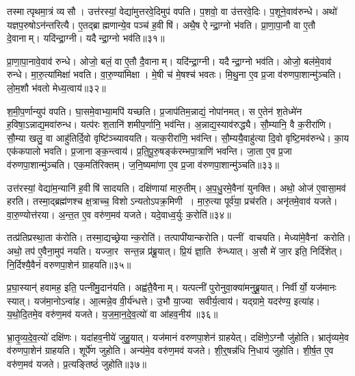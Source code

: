 तस्मात्पृथमा॒त्रं व्यसौ।
उत्त॑रस्यां॒ वेद्या॑मुत्तरवे॒दिमुप॑ वपति।
प॒शवो॒ वा उ॑त्तरवे॒दिः।
प॒शूने॒वाव॑रुन्धे।
अथो॑ यज्ञप॒रुषोऽन॑न्तरित्यै।
ए॒तद्ब्राह्मणान्ये॒व पञ्च॑ ह॒वीषि॑।
अथै॒ष ऐन्द्रा॒ग्नो भ॑वति।
प्रा॒णा॒पा॒नौ वा ए॒तौ दे॒वानाम्।
यदि॑न्द्रा॒ग्नी।
यदैन्द्रा॒ग्नो भव॑ति॥३१॥

प्रा॒णा॒पा॒नावे॒वाव॑ रुन्धे।
ओजो॒ बलं॒ वा ए॒तौ दै॒वानाम्।
यदि॑न्द्रा॒ग्नी।
यदैन्द्रा॒ग्नो भव॑ति।
ओजो॒ बल॑मे॒वाव॑ रुन्धे।
मा॒रु॒त्या॑मिक्षा॑ भवति।
वा॒रु॒ण्या॑मिक्षा।
मे॒षी च॑ मे॒षश्च॑ भवतः।
मि॒थु॒ना ए॒व प्र॒जा व॑रुणपा॒शान्मु॑ञ्चति।
लो॒म॒शौ भ॑वतो मेध्य॒त्वाय॑॥३२॥

श॒मी॒प॒र्णान्युप॑ वपति।
घा॒समे॒वाभ्या॒मपि॑ यच्छति।
प्र॒जाप॑तिम॒न्नाद्यं॒ नोपा॑नमत्।
स ए॒तेन॑ श॒तेध्मे॑न ह॒विषा॒ऽन्नाद्य॒मवा॑रुन्ध।
यत्प॑रः श॒तानि॑ शमीप॒र्णानि॒ भव॑न्ति।
अ॒न्नाद्य॒स्याव॑रुद्ध्यै।
सौ॒म्यानि॒ वै क॒रीरा॑णि।
सौ॒म्या खलु॒ वा आहु॑तिर्दि॒वो वृष्टि॑ञ्च्यावयति।
यत्क॒रीरा॑णि॒ भव॑न्ति।
सौ॒म्ययै॒वाहु॑त्या दि॒वो वृष्टि॒मव॑रुन्धे।
का॒य एक॑कपालो भवति।
प्र॒जानाङ्क॒न्त्वाय॑।
प्र॒ति॒पू॒रु॒षङ्क॑रम्भपा॒त्राणि॑ भवन्ति।
जा॒ता ए॒व प्र॒जा व॑रुणपा॒शान्मु॑ञ्चति।
एक॒मति॑रिक्तम्।
ज॒नि॒ष्यमा॑णा ए॒व प्र॒जा व॑रुणपा॒शान्मु॑ञ्चति॥३३॥\anuvakamend[नि॒रु॒प्यन्ते॑ भवतो॒ भव॑ति मेध्य॒त्वाय॑ रुन्धे॒ षट्च॑]

उत्त॑रस्यां॒ वेद्या॑म॒न्यानि॑ ह॒वीषि॑ सादयति।
दक्षि॑णायां मारु॒तीम्।
अ॒प॒धु॒रमे॒वैना॑ युनक्ति।
अथो॒ ओज॑ ए॒वासा॒मव॑ हरति।
तस्मा॒द्ब्रह्म॑णश्च क्ष॒त्राच्च॒ विशोऽन्यतोऽपक्र॒मिणी।
मा॒रु॒त्या पूर्व॑या॒ प्रच॑रति।
अनृ॑तमे॒वाव॑ यजते।
वा॒रु॒ण्योत्त॑रया।
अ॒न्त॒त ए॒व वरु॑ण॒मव॑ यजते।
यदे॒वाध्व॒र्युः क॒रोति॑॥३४॥

तत्प्र॑तिप्रस्था॒ता क॑रोति।
तस्मा॒द्यच्छ्रेयान्क॒रोति॑।
तत्पापी॑यान्करोति।
पत्नीं वाचयति।
मेध्या॑मे॒वैनां करोति।
अथो॒ तप॑ ए॒वैना॒मुप॑ नयति।
यज्जा॒र सन्त॒न्न प्र॑ब्रू॒यात्।
प्रि॒यं ज्ञा॒ति रु॑न्ध्यात्।
अ॒सौ मे॑ जा॒र इति॒ निर्दि॑शेत्।
नि॒र्दिश्यै॒वैनं॑ वरुणपा॒शेन॑ ग्राहयति॥३५॥

प्र॒घा॒स्यान्॑ हवामह॒ इति॒ पत्नी॑मु॒दान॑यति।
अह्व॑तै॒वैनाम्।
यत्पत्नी॑ पुरोनुवा॒क्या॑मनुब्रू॒यात्।
निर्वीर्यो॒ यज॑मानः स्यात्।
यज॑मा॒नोऽन्वा॑ह।
आ॒त्मन्ने॒व वी॒र्य॑न्धत्ते।
उ॒भौ या॒ज्या सवीर्य॒त्वाय॑।
यद्ग्रामे॒ यदर॑ण्य॒ इत्या॑ह।
य॒थो॒दि॒तमे॒व वरु॑ण॒मव॑ यजते।
य॒ज॒मा॒न॒दे॒व॒त्यो॑ वा आ॑हव॒नीय॑॥३६॥

भ्रा॒तृ॒व्य॒दे॒व॒त्यो॑ दक्षि॑णः।
यदा॑हव॒नीये॑ जुहु॒यात्।
यज॑मानं वरुणपा॒शेन॑ ग्राहयेत्।
दक्षि॑णे॒ऽग्नौ जु॑होति।
भ्रातृ॑व्यमे॒व व॑रुणपा॒शेन॑ ग्राहयति।
शूर्पे॑ण जुहोति।
अन्य॑मे॒व वरु॑ण॒मव॑ यजते।
शी॒र्॒षन्न॑धि नि॒धाय॑ जुहोति।
शी॒र्\mbox{}ष॒त ए॒व वरु॑ण॒मव॑ यजते।
प्र॒त्यङ्तिष्ठं॑ जुहोति॥३७॥

